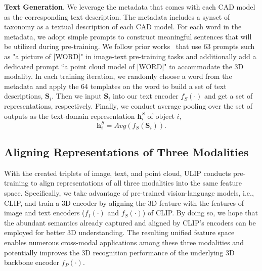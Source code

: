 \noindent\textbf{Text Generation}. We leverage the metadata that comes with each CAD model as the corresponding text description. The metadata includes a synset of taxonomy as a textual description of each CAD model. For each word in the metadata, we adopt simple prompts to construct meaningful sentences that will be utilized during pre-training. We follow prior works~\cite{gu2021open,gao2021towards} that use 63 prompts such as "a picture of [WORD]" in image-text pre-training tasks and additionally add a dedicated prompt ``a point cloud model of [WORD]" to accommodate the 3D modality. 
In each training iteration, we randomly choose a word from the metadata and apply the 64 templates on the word to build a set of text descriptions, $\mathbf{S}_i$.
Then we input $\mathbf{S}_i$ into our text encoder $f_S(\cdot)$ and get a set of representations, respectively. Finally, we conduct average pooling over the set of outputs as the text-domain representation $\mathbf{h}_i^{S}$ of object $i$,
\begin{equation}
 \label{eq:text-rep}
   \mathbf{h}_i^{S} = Avg(f_S(\mathbf{S}_i)).
\end{equation}

\subsection{Aligning Representations of Three Modalities}
\label{sec:align representation}
With the created triplets of image, text, and point cloud, ULIP conducts pre-training to align representations of all three modalities into the same feature space.
Specifically, we take advantage of pre-trained vision-language models, i.e., CLIP, and train a 3D encoder by aligning the 3D feature with the features of image and text encoders ($f_I(\cdot)$ and  $f_S(\cdot)$) of CLIP.
By doing so, we hope that the abundant semantics already captured and aligned by CLIP's encoders can be employed for better 3D understanding.
The resulting unified feature space enables numerous cross-modal applications among these three modalities and potentially improves the 3D recognition performance of the underlying 3D backbone encoder $f_P(\cdot)$.

